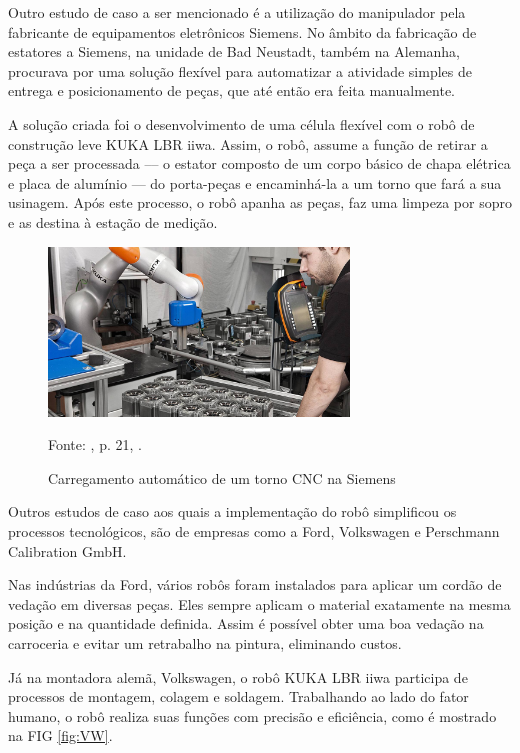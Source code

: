 Outro estudo de caso a ser mencionado é a utilização do manipulador pela fabricante de equipamentos eletrônicos Siemens. No âmbito da fabricação de estatores a Siemens, na unidade de Bad Neustadt, também na Alemanha, procurava por uma solução flexível para automatizar a atividade simples de entrega e posicionamento de peças, que até então era feita manualmente. 

A solução criada foi o desenvolvimento de uma célula flexível com o robô de construção leve KUKA LBR iiwa. Assim, o robô, assume a função de retirar a peça a ser processada --– o estator composto de um corpo básico de chapa elétrica e placa de alumínio --- do porta-peças e encaminhá-la a um torno que fará a sua usinagem. Após este processo, o robô apanha as peças, faz uma limpeza por sopro e as destina à estação de medição.

\begin{figure}[h]
    \centering
    \includegraphics[width=8cm]{Imagem/Siemens.jpg}
    \caption{Carregamento automático de um torno CNC na Siemens}
    \label{fig:SIEMENS}
    \begin{flushleft}
    Fonte: \citeauthor{KUKAmanual}, p. 21, \citeyear{KUKAmanual}.
    \end{flushleft}
\end{figure}

Outros estudos de caso aos quais a implementação do robô simplificou os processos tecnológicos, são de empresas como a Ford, Volkswagen e Perschmann Calibration GmbH. 

Nas indústrias da Ford, vários robôs foram instalados para aplicar um cordão de vedação em diversas peças. Eles sempre aplicam o material exatamente na mesma posição e na quantidade definida. Assim é possível obter uma boa vedação na carroceria e evitar um retrabalho na pintura, eliminando custos.

Já na montadora alemã, Volkswagen, o robô KUKA LBR iiwa participa de processos de montagem, colagem e soldagem. Trabalhando ao lado do fator humano, o robô realiza suas funções com precisão e eficiência, como é mostrado na FIG \ref{fig:VW}. 

